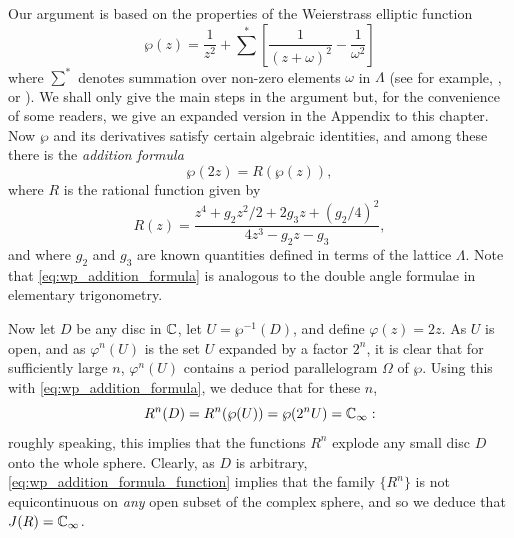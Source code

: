 \begin{example}
    Our argument is based on the properties of the Weierstrass elliptic function
    \begin{equation*}
        \wp(z) = \frac{1}{z^2} +  {\sum}^*\left[\frac{1}{(z + \omega)^2} - \frac{1}{\omega^2}\right]
    \end{equation*}
    where ${\sum}^*$ denotes summation over non-zero elements $\omega$ in
    $\Lambda$ (see for example, \cite[272--276]{Ahlfors1979}, \cite{DuVal1973}
    or \cite{Lang1987}). We shall only give the main steps in the argument but,
    for the convenience of some readers, we give an expanded version in the
    Appendix to this chapter. Now $\wp$ and its derivatives satisfy certain
    algebraic identities, and among these there is the \emph{addition formula}
    \begin{equation}
        \label{eq:wp_addition_formula}
        \wp(2z) = R(\wp(z)),
    \end{equation}
    where $R$ is the rational function given by
    \begin{equation}
        \label{eq:wp_addition_formula_function}
        R(z) = \frac{z^4 + g_2 z^2/2 + 2g_3z + (g_2/4)^2}{4z^3 - g_2z - g_3},
    \end{equation}
    and where $g_2$ and $g_3$ are known quantities defined in terms of the
    lattice $\Lambda$. Note that \eqref{eq:wp_addition_formula} is analogous to
    the double angle formulae in elementary trigonometry.

    Now let $D$ be any disc in $\mathbb{C}$, let $U = \wp^{-1}(D)$, and define
    $\varphi(z) = 2z$. As $U$ is open, and as $\varphi^n(U)$ is the set $U$
    expanded by a factor $2^n$, it is clear that for sufficiently large $n$,
    $\varphi^n(U)$ contains a period parallelogram $\Omega$ of $\wp$. Using this
    with \eqref{eq:wp_addition_formula}, we deduce that for these $n$,
    \begin{equation*}
        R^n(D) = R^n(\wp(U)) = \wp(2^n U) = \mathbb{C}_\infty:
    \end{equation*}
    roughly speaking, this implies that the functions $R^n$ explode any small
    disc $D$ onto the whole sphere. Clearly, as $D$ is arbitrary,
    \eqref{eq:wp_addition_formula_function} implies that the family $\{R^n\}$ is
    not equicontinuous on \emph{any} open subset of the complex sphere, and so
    we deduce that $J(R) = \mathbb{C}_\infty$.


\end{example}

